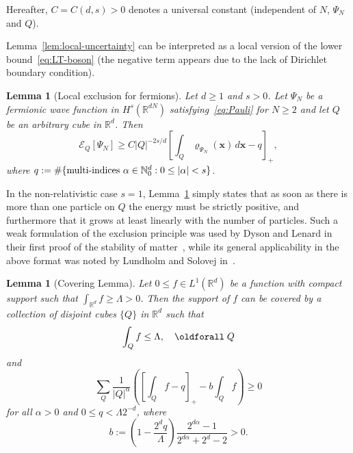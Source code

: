 \documentclass[10pt]{amsart}
\newtheorem{lemm}[theo]{Lemma}\newtheorem{prop}[theo]{Proposition}\newtheorem{coro}[theo]{Corollary}\newtheorem{conj}[theo]{Conjecture}
\theoremstyle{definition}\newtheorem{defi}[theo]{Definition}\newtheorem{rema}[theo]{Remark}\newtheorem{exam}[theo]{Example}\newtheorem{exem}[theo]{Example}\newtheorem{nota}[theo]{Notation}
\newcommand*\N {\mathbb{N}}
\newcommand*\R {\mathbb{R}}
\newcommand\1{{\ensuremath {\mathds 1} }}
\newcommand{\bx}{\mathbf{x}}
\newcommand{\cE}{\mathcal{E}}
\renewcommand*{\forall}{\mathrel{\oldforall}}
\begin{document}
Hereafter, $C=C(d,s)>0$ denotes a universal constant (independent of $N$, $\Psi_N$ and $Q$).

Lemma~\ref{lem:local-uncertainty} can be interpreted as a local version of the lower bound~\eqref{eq:LT-boson} (the negative term appears due to the lack of Dirichlet boundary condition).


\begin{lemm}[Local exclusion for fermions]\label{lem:local-exclusion-fermions}
Let $d\ge 1$ and $s>0$. Let $\Psi_N$ be a fermionic wave function in $H^s(\R^{dN})$ satisfying~\eqref{eq:Pauli} for $N \ge 2$ and let $Q$ be an arbitrary cube in $\R^d$. Then
\begin{equation}\label{eq:local-exclusion}
\cE_Q[\Psi_N] \ge C |Q|^{-2s/d} \left[\int_Q \varrho_{\Psi_N}(\bx)\,d\bx - q \right]_+,
\end{equation}
where $q := \# \{ \textup{multi-indices}\ \alpha \in \N_0^d : 0 \le |\alpha|<s \}$.
\end{lemm}

In the non-relativistic case $s=1$, Lemma~\ref{lem:local-exclusion-fermions} simply states that as soon as there is more than one particle on $Q$ the energy must be strictly positive, and furthermore that it grows at least linearly with the number of particles. Such a weak formulation of the exclusion principle was used by Dyson and Lenard in their first proof of the stability of matter~\cite{DysLen-67}, while its general applicability in the above format was noted by Lundholm and Solovej in~\cite{LunSol-13a,LunSol-13b}.

\begin{lemm}[Covering Lemma] \label{lem:covering}
Let $0\le f\in L^1(\R^d)$ be a function with compact support such that $\int_{\R^d} f \ge \Lambda>0$. Then the support of $f$ can be covered by a collection of disjoint cubes $\{Q\}$ in $\R^d$ such that
\begin{equation}\label{eq:covering-0}
\int_{Q} f \le \Lambda, \quad \forall Q
\end{equation}
and
\begin{equation}\label{eq:covering}
\sum_{Q} \frac{1}{|Q|^{\alpha}} \left(\left[\int_{Q} f - q \right]_+ - b \int_{Q} f \right) \ge 0
\end{equation}
for all $\alpha>0$ and $0\le q< \Lambda 2^{-d}$, where
\[
b:= \left(1- \frac{2^dq}{\Lambda} \right) \frac{2^{d\alpha}-1}{2^{d\alpha} + 2^d - 2}>0.
\]
\end{lemm}
\end{document}
